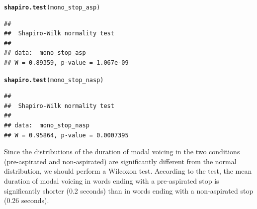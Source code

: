 \documentclass[a4paper,11pt]{article}\usepackage[]{graphicx}\usepackage[]{color}
\makeatletter
\newcommand{\hlstd}[1]{\textcolor[rgb]{0.345,0.345,0.345}{#1}}%
\newcommand{\hlkwd}[1]{\textcolor[rgb]{0.737,0.353,0.396}{\textbf{#1}}}%
\newenvironment{kframe}{%
 \def\at@end@of@kframe{}%
 \ifinner\ifhmode%
  \def\at@end@of@kframe{\end{minipage}}%
  \begin{minipage}{\columnwidth}%
 \fi\fi%
 \def\FrameCommand##1{\hskip\@totalleftmargin \hskip-\fboxsep
 \colorbox{shadecolor}{##1}\hskip-\fboxsep
     \hskip-\linewidth \hskip-\@totalleftmargin \hskip\columnwidth}%
 \MakeFramed {\advance\hsize-\width
   \@totalleftmargin\z@ \linewidth\hsize
   \@setminipage}}%
 {\par\unskip\endMakeFramed%
 \at@end@of@kframe}
\newenvironment{knitrout}{}{} %
\makeatother
\begin{document}
\begin{knitrout}
\color{fgcolor}\begin{kframe}
\begin{alltt}
\hlkwd{shapiro.test}\hlstd{(mono_stop_asp)}
\end{alltt}
\begin{verbatim}
## 
## 	Shapiro-Wilk normality test
## 
## data:  mono_stop_asp
## W = 0.89359, p-value = 1.067e-09
\end{verbatim}
\begin{alltt}
\hlkwd{shapiro.test}\hlstd{(mono_stop_nasp)}
\end{alltt}
\begin{verbatim}
## 
## 	Shapiro-Wilk normality test
## 
## data:  mono_stop_nasp
## W = 0.95864, p-value = 0.0007395
\end{verbatim}
\end{kframe}
\end{knitrout}

Since the distributions of the duration of modal voicing in the two conditions (pre-aspirated and non-aspirated) are significantly different from the normal distribution, we should perform a Wilcoxon test.
According to the test, the mean duration of modal voicing in words ending with a pre-aspirated stop is significantly shorter (0.2 seconds) than in words ending with a non-aspirated stop (0.26 seconds).
\end{document}
